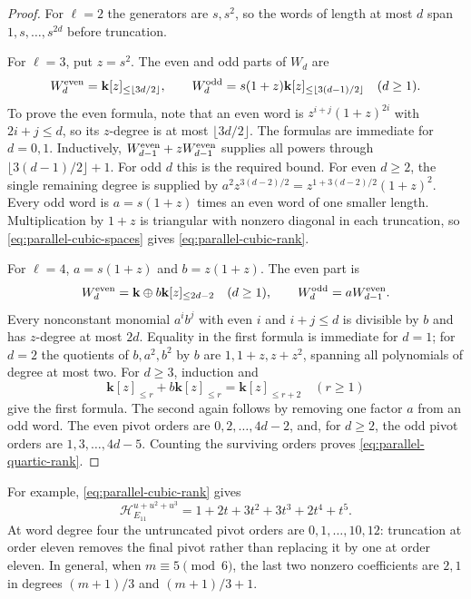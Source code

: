 \documentclass[reqno]{article}
\theoremstyle{plain} %
\theoremstyle{definition}
\theoremstyle{remark}
\newcommand{\K} {\mathbf{k}}
\newcommand{\hs}{\mathscr{H}}
\numberwithin{equation}{section}
\begin{document}
\begin{proof}
For $\ell=2$ the generators are $s,s^2$, so the words of length at
most $d$ span $1,s,\ldots,s^{2d}$ before truncation.

For $\ell=3$, put $z=s^2$. The even and odd parts of $W_d$ are
\begin{equation}\label{eq:parallel-cubic-spaces}
 W_d^{\rm even}=\K[z]_{\le\lfloor3d/2\rfloor},\qquad
 W_d^{\rm odd}=s(1+z)\K[z]_{\le\lfloor3(d-1)/2\rfloor}
 \quad(d\ge1).
\end{equation}
To prove the even formula, note that an even word is
$z^{i+j}(1+z)^{2i}$ with $2i+j\le d$, so its $z$-degree is at most
$\lfloor3d/2\rfloor$. The formulas are immediate for $d=0,1$.
Inductively, $W_{d-1}^{\rm even}+zW_{d-1}^{\rm even}$ supplies all
powers through $\lfloor3(d-1)/2\rfloor+1$. For odd $d$ this is the
required bound. For even $d\ge2$, the single remaining degree is
supplied by
$a^2z^{3(d-2)/2}=z^{1+3(d-2)/2}(1+z)^2$.
Every odd word is $a=s(1+z)$ times an even word of one smaller length.
Multiplication by $1+z$ is triangular with nonzero diagonal in each
truncation, so \eqref{eq:parallel-cubic-spaces} gives
\eqref{eq:parallel-cubic-rank}.

For $\ell=4$, $a=s(1+z)$ and $b=z(1+z)$. The even part is
\begin{equation}\label{eq:parallel-quartic-spaces}
 W_d^{\rm even}=\K\oplus b\K[z]_{\le2d-2}\quad(d\ge1),
 \qquad W_d^{\rm odd}=aW_{d-1}^{\rm even}.
\end{equation}
Every nonconstant monomial $a^i b^j$ with even $i$ and $i+j\le d$
is divisible by $b$ and has $z$-degree at most $2d$. Equality in the first formula is immediate for $d=1$; for $d=2$
the quotients of $b,a^2,b^2$ by $b$ are $1,1+z,z+z^2$, spanning all
polynomials of degree at most two. For $d\ge3$, induction and
\[
 \K[z]_{\le r}+b\K[z]_{\le r}=\K[z]_{\le r+2}\quad(r\ge1)
\]
give the first formula. The second again follows by removing one
factor $a$ from an odd word. The even pivot orders are
$0,2,\ldots,4d-2$, and, for $d\ge2$, the odd pivot orders are
$1,3,\ldots,4d-5$. Counting the surviving orders proves
\eqref{eq:parallel-quartic-rank}.
\end{proof}

For example, \eqref{eq:parallel-cubic-rank} gives
\[
 \hs_{E_{11}}^{u+u^2+u^3}
 =1+2t+3t^2+3t^3+2t^4+t^5.
\]
At word degree four the untruncated pivot orders are
$0,1,\ldots,10,12$: truncation at order eleven removes the final
pivot rather than replacing it by one at order eleven.
In general, when $m\equiv5\pmod6$, the last two nonzero coefficients
are $2,1$ in degrees $(m+1)/3$ and $(m+1)/3+1$.
\end{document}
